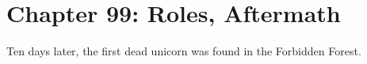 \chapter{Chapter 99: Roles, Aftermath}
Ten days later, the first dead unicorn was found in the Forbidden
Forest.
